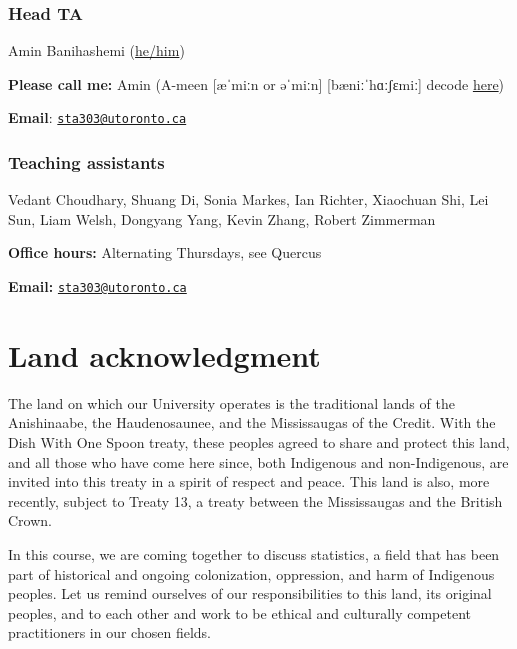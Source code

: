 \documentclass[
  openany]{book}
\begin{document}
\hypertarget{head-ta}{%
\subsubsection{Head TA}\label{head-ta}}

Amin Banihashemi (\href{https://www.mypronouns.org/he-him}{he/him})

\textbf{Please call me:} Amin (A-meen {[}æˈmiːn or əˈmiːn{]} {[}bæniːˈhɑːʃɛmiː{]} decode \href{https://easypronunciation.com/en/phonetic-symbols-chart/british-english/ipa}{here})

\textbf{Email}: \href{mailto:sta303@utoronto.ca}{\nolinkurl{sta303@utoronto.ca}}

\hypertarget{teaching-assistants}{%
\subsubsection{Teaching assistants}\label{teaching-assistants}}

Vedant Choudhary, Shuang Di, Sonia Markes, Ian Richter, Xiaochuan Shi, Lei Sun, Liam Welsh, Dongyang Yang, Kevin Zhang, Robert Zimmerman

\textbf{Office hours:} Alternating Thursdays, see Quercus

\textbf{Email:} \href{mailto:sta303@utoronto.ca}{\nolinkurl{sta303@utoronto.ca}}

\hypertarget{land-acknowledgment}{%
\section{Land acknowledgment}\label{land-acknowledgment}}

The land on which our University operates is the traditional lands of the Anishinaabe, the Haudenosaunee, and the Mississaugas of the Credit. With the Dish With One Spoon treaty, these peoples agreed to share and protect this land, and all those who have come here since, both Indigenous and non-Indigenous, are invited into this treaty in a spirit of respect and peace. This land is also, more recently, subject to Treaty 13, a treaty between the Mississaugas and the British Crown.

In this course, we are coming together to discuss statistics, a field that has been part of historical and ongoing colonization, oppression, and harm of Indigenous peoples. Let us remind ourselves of our responsibilities to this land, its original peoples, and to each other and work to be ethical and culturally competent practitioners in our chosen fields.
\end{document}
